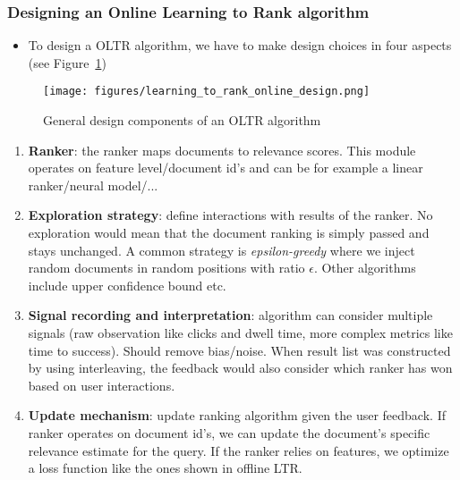 \subsubsection{Designing an Online Learning to Rank algorithm}
\begin{itemize}
	\item To design a OLTR algorithm, we have to make design choices in four aspects (see Figure~\ref{img:learning_to_rank_online_design})
\end{itemize}
\begin{figure}[ht]
	\centering
	\texttt{[image: figures/learning\_to\_rank\_online\_design.png]}
	\caption{General design components of an OLTR algorithm}
	\label{img:learning_to_rank_online_design}
\end{figure}
\begin{enumerate}[label=(\Alph*)]
	\item \textbf{Ranker}: the ranker maps documents to relevance scores. This module operates on feature level/document id's and can be for example a linear ranker/neural model/...
	\item \textbf{Exploration strategy}: define interactions with results of the ranker. No exploration would mean that the document ranking is simply passed and stays unchanged. A common strategy is \textit{epsilon-greedy} where we inject random documents in random positions with ratio $\epsilon$. Other algorithms include upper confidence bound etc.
	\item \textbf{Signal recording and interpretation}: algorithm can consider multiple signals (raw observation like clicks and dwell time, more complex metrics like time to success). Should remove bias/noise. When result list was constructed by using interleaving, the feedback would also consider which ranker has won based on user interactions.
	\item \textbf{Update mechanism}: update ranking algorithm given the user feedback. If ranker operates on document id's, we can update the document's specific relevance estimate for the query. If the ranker relies on features, we optimize a loss function like the ones shown in offline LTR.
\end{enumerate}
